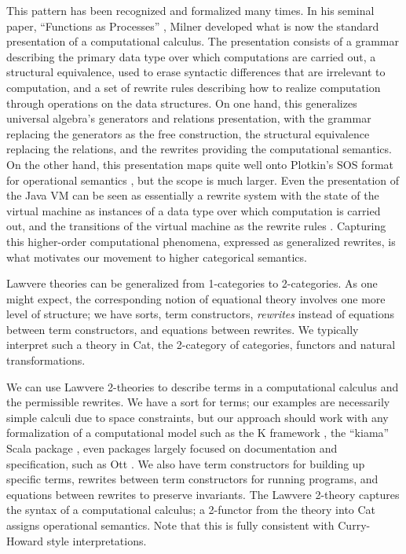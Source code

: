 \documentclass{llncs}
\begin{document}
  This pattern has been recognized and formalized many times.  In his
  seminal paper, ``Functions as Processes''
  \cite{DBLP:journals/mscs/Milner92}, Milner developed what is now the
  standard presentation of a computational calculus.  The presentation
  consists of a grammar describing the primary data type over which
  computations are carried out, a structural equivalence, used to
  erase syntactic differences that are irrelevant to computation, and
  a set of rewrite rules describing how to realize computation through
  operations on the data structures.  On one hand, this generalizes
  universal algebra's generators and relations presentation, with the
  grammar replacing the generators as the free construction, the
  structural equivalence replacing the relations, and the rewrites
  providing the computational semantics.  On the other hand, this
  presentation maps quite well onto Plotkin's SOS format for
  operational semantics \cite{Plotkin04theorigins}, but the scope is
  much larger.  Even the presentation of the Java VM can be seen as
  essentially a rewrite system with the state of the virtual machine
  as instances of a data type over which computation is carried out,
  and the transitions of the virtual machine as the rewrite rules
  \cite{DBLP:conf/oopsla/IgarashiPW99}.  Capturing this higher-order
  computational phenomena, expressed as generalized rewrites, is what
  motivates our movement to higher categorical semantics.
  

  Lawvere theories can be generalized from  1-categories to 2-categories.  As one might expect, the corresponding notion of equational theory involves one more level of structure; we have sorts, term constructors, {\em rewrites} instead of equations between term constructors, and equations between rewrites.  We typically interpret such a theory in Cat, the  2-category of categories, functors and natural transformations.

  We can use Lawvere 2-theories to describe terms in a computational calculus and the permissible rewrites.  We have a sort for terms;  our examples are necessarily simple calculi due to space constraints, but our approach should work with any formalization of a computational model such as the K framework \cite{DBLP:journals/jlp/RosuS10}, the  ``kiama'' Scala package \cite{DBLP:conf/gttse/Sloane09}, even packages largely focused on documentation and specification, such as Ott  \cite{DBLP:journals/jfp/SewellNOPRSS10}.  We also have term constructors for building up specific terms, rewrites between term constructors for running programs, and equations between rewrites to preserve invariants.  The Lawvere 2-theory captures the syntax of a computational calculus; a 2-functor from the theory into Cat assigns operational semantics.  Note that this is fully consistent with Curry-Howard style interpretations.
\end{document}

